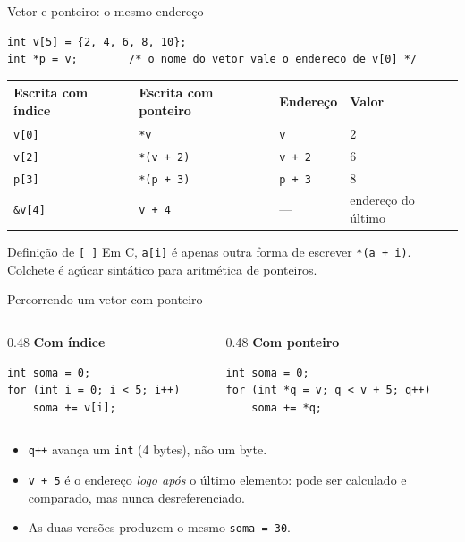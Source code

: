 \documentclass[aspectratio=169]{beamer}
\begin{document}
\begin{frame}[fragile]{Vetor e ponteiro: o mesmo endereço}
\begin{lstlisting}
int v[5] = {2, 4, 6, 8, 10};
int *p = v;        /* o nome do vetor vale o endereco de v[0] */
\end{lstlisting}
  \begin{center}
  \small
  \begin{tabular}{llll}
    \toprule
    Escrita com índice & Escrita com ponteiro & Endereço & Valor \\
    \midrule
    \texttt{v[0]} & \texttt{*v}       & \texttt{v}     & 2 \\
    \texttt{v[2]} & \texttt{*(v + 2)} & \texttt{v + 2} & 6 \\
    \texttt{p[3]} & \texttt{*(p + 3)} & \texttt{p + 3} & 8 \\
    \texttt{\&v[4]} & \texttt{v + 4}  & ---            & endereço do último \\
    \bottomrule
  \end{tabular}
  \end{center}
  \begin{block}{Definição de \texttt{[\,]}}
    Em C, \texttt{a[i]} é apenas outra forma de escrever \texttt{*(a + i)}.
    Colchete é açúcar sintático para aritmética de ponteiros.
  \end{block}
\end{frame}

\begin{frame}[fragile]{Percorrendo um vetor com ponteiro}
\begin{columns}[T]
\begin{column}{0.48\textwidth}
\textbf{Com índice}
\begin{lstlisting}[basicstyle=\ttfamily\scriptsize]
int soma = 0;
for (int i = 0; i < 5; i++)
    soma += v[i];
\end{lstlisting}
\end{column}
\begin{column}{0.48\textwidth}
\textbf{Com ponteiro}
\begin{lstlisting}[basicstyle=\ttfamily\scriptsize]
int soma = 0;
for (int *q = v; q < v + 5; q++)
    soma += *q;
\end{lstlisting}
\end{column}
\end{columns}
  \begin{itemize}
    \item \texttt{q++} avança um \texttt{int} (4 bytes), não um byte.
    \item \texttt{v + 5} é o endereço \emph{logo após} o último elemento: pode
      ser calculado e comparado, mas nunca desreferenciado.
    \item As duas versões produzem o mesmo \texttt{soma = 30}.
  \end{itemize}
\end{frame}
\end{document}

